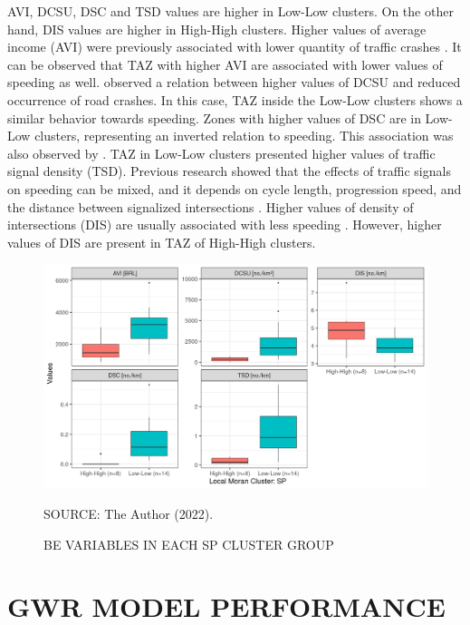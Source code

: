 AVI, DCSU, DSC and TSD values are higher in Low-Low clusters. On the other hand, DIS values are higher in High-High clusters. Higher values of average income (AVI) were previously associated with lower quantity of traffic crashes \cite{Obelheiro2019, Marshall2017}. It can be observed that TAZ with higher AVI are associated with lower values of speeding as well. \textcite{Ouyang2014,Welle2016} observed a relation between higher values of DCSU and reduced occurrence of road crashes. In this case, TAZ inside the Low-Low clusters shows a similar behavior towards speeding. Zones with higher values of DSC are in Low-Low clusters, representing an inverted relation to speeding. This association was also observed by \textcite{Li2013a, Oliveira2015}. TAZ in Low-Low clusters presented higher values of traffic signal density (TSD). Previous research showed that the effects of traffic signals on speeding can be mixed, and it depends on cycle length, progression speed, and the distance between signalized intersections \cite{Elvik2009, Furth2018}. Higher values of density of intersections (DIS) are usually associated with less speeding \cite{Dumbaugh2009, Huang2018, Obelheiro2020}. However, higher values of DIS are present in TAZ of High-High clusters.

\begin{figure}[!htbp]
    \footnotesize
    \captionsetup{font=footnotesize}
    \caption{BE VARIABLES IN EACH SP CLUSTER GROUP}
    \centering
    \includegraphics{fig/wilcox_hist.png}
    \label{fig:wilcox_sp}
    \par SOURCE: The Author (2022).
\end{figure}

\section{GWR MODEL PERFORMANCE} \label{sec:gwr_perf}

